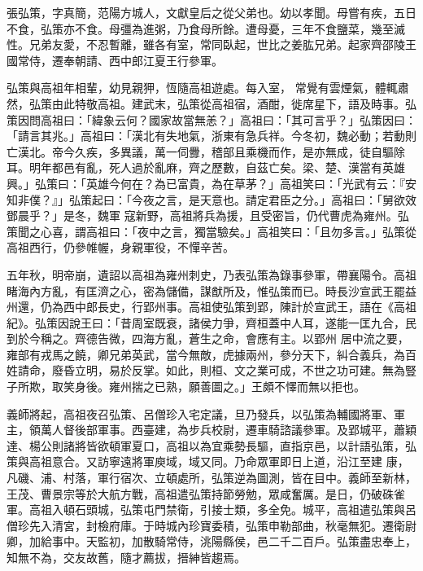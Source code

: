 
\begin{pinyinscope}

 張弘策，字真簡，范陽方城人，文獻皇后之從父弟也。幼以孝聞。母嘗有疾，五日不食，弘策亦不食。母彊為進粥，乃食母所餘。遭母憂，三年不食鹽菜，幾至滅性。兄弟友愛，不忍暫離，雖各有室，常同臥起，世比之姜肱兄弟。起家齊邵陵王國常侍，遷奉朝請、西中郎江夏王行參軍。



 弘策與高祖年相輩，幼見親狎，恆隨高祖遊處。每入室，
 常覺有雲煙氣，體輒肅然，弘策由此特敬高祖。建武末，弘策從高祖宿，酒酣，徙席星下，語及時事。弘策因問高祖曰：「緯象云何？國家故當無恙？」高祖曰：「其可言乎？」弘策因曰：「請言其兆。」高祖曰：「漢北有失地氣，浙東有急兵祥。今冬初，魏必動；若動則亡漢北。帝今久疾，多異議，萬一伺釁，稽部且乘機而作，是亦無成，徒自驅除耳。明年都邑有亂，死人過於亂麻，齊之歷數，自茲亡矣。梁、楚、漢當有英雄興。」弘策曰：「英雄今何在？為已富貴，為在草茅？」高祖笑曰：「光武有云：『安知非僕？』」弘策起曰：「今夜之言，是天意也。請定君臣之分。」高祖曰：「舅欲效鄧晨乎？」是冬，魏軍
 寇新野，高祖將兵為援，且受密旨，仍代曹虎為雍州。弘策聞之心喜，謂高祖曰：「夜中之言，獨當驗矣。」高祖笑曰：「且勿多言。」弘策從高祖西行，仍參帷幄，身親軍役，不憚辛苦。



 五年秋，明帝崩，遺詔以高祖為雍州刺史，乃表弘策為錄事參軍，帶襄陽令。高祖睹海內方亂，有匡濟之心，密為儲備，謀猷所及，惟弘策而已。時長沙宣武王罷益州還，仍為西中郎長史，行郢州事。高祖使弘策到郢，陳計於宣武王，語在《高祖紀》。弘策因說王曰：「昔周室既衰，諸侯力爭，齊桓蓋中人耳，遂能一匡九合，民到於今稱之。齊德告微，四海方亂，蒼生之命，會應有主。以郢州
 居中流之要，雍部有戎馬之饒，卿兄弟英武，當今無敵，虎據兩州，參分天下，糾合義兵，為百姓請命，廢昏立明，易於反掌。如此，則桓、文之業可成，不世之功可建。無為豎子所欺，取笑身後。雍州揣之已熟，願善圖之。」王頗不懌而無以拒也。



 義師將起，高祖夜召弘策、呂僧珍入宅定議，旦乃發兵，以弘策為輔國將軍、軍主，領萬人督後部軍事。西臺建，為步兵校尉，遷車騎諮議參軍。及郢城平，蕭穎達、楊公則諸將皆欲頓軍夏口，高祖以為宜乘勢長驅，直指京邑，以計語弘策，弘策與高祖意合。又訪寧遠將軍庾域，域又同。乃命眾軍即日上道，沿江至建
 康，凡磯、浦、村落，軍行宿次、立頓處所，弘策逆為圖測，皆在目中。義師至新林，王茂、曹景宗等於大航方戰，高祖遣弘策持節勞勉，眾咸奮厲。是日，仍破硃雀軍。高祖入頓石頭城，弘策屯門禁衛，引接士類，多全免。城平，高祖遣弘策與呂僧珍先入清宮，封檢府庫。于時城內珍寶委積，弘策申勒部曲，秋毫無犯。遷衛尉卿，加給事中。天監初，加散騎常侍，洮陽縣侯，邑二千二百戶。弘策盡忠奉上，知無不為，交友故舊，隨才薦拔，搢紳皆趨焉。




\end{pinyinscope}
